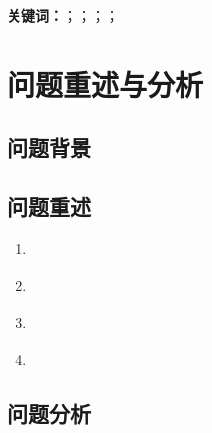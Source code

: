 \documentclass[12pt]{article}
\begin{document}
\vspace{0.5cm}
\noindent\textbf{关键词：}\underline{\hspace{2cm}}；\underline{\hspace{2cm}}；\underline{\hspace{2cm}}；\underline{\hspace{2cm}}；\underline{\hspace{2cm}}

\newpage

\section{问题重述与分析}
\subsection{问题背景}

\subsection{问题重述}
\begin{enumerate}[label=问题\arabic*：]
  \item \underline{\hspace{6cm}}
  \item \underline{\hspace{6cm}}
  \item \underline{\hspace{6cm}}
  \item \underline{\hspace{6cm}}
\end{enumerate}

\subsection{问题分析}

\end{document}
